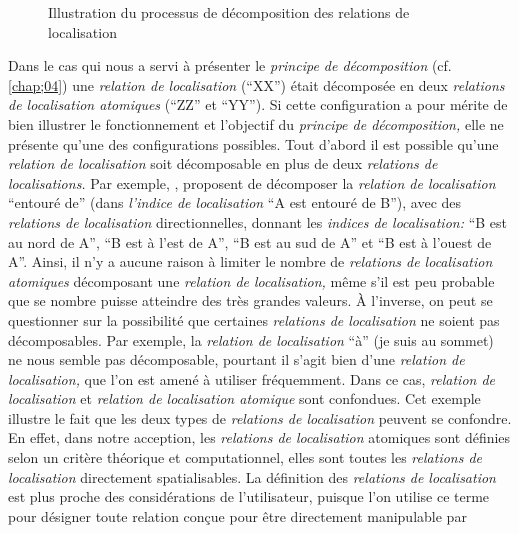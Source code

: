 
\begin{figure}
  \centering
  
  \caption{Illustration du processus de décomposition des relations de
  localisation}
  \label{fig:logique_dec}
\end{figure}


Dans le cas qui nous a servi à présenter le \emph{principe de
  décomposition} (cf. \autoref{chap;04}) une \emph{relation de
  localisation} (\enquote{XX}) était décomposée en deux
\emph{relations de localisation atomiques} (\enquote{ZZ} et
\enquote{YY}). Si cette configuration a pour mérite de bien illustrer
le fonctionnement et l'objectif du \emph{principe de décomposition,}
elle ne présente qu'une des configurations possibles. Tout d'abord il
est possible qu'une \emph{relation de localisation} soit décomposable
en plus de deux \emph{relations de localisations.} Par exemple,
\textcite{Vanegas2011}, proposent de décomposer la \emph{relation de
  localisation} \enquote{entouré de} (dans \emph{l'indice de
  localisation} \enquote{A est entouré de B}), avec des
\emph{relations de localisation} directionnelles, donnant les
\emph{indices de localisation:} \enquote{B est au nord de A},
\enquote{B est à l'est de A}, \enquote{B est au sud de A} et
\enquote{B est à l'ouest de A}. Ainsi, il n'y a aucune raison à
limiter le nombre de \emph{relations de localisation atomiques}
décomposant une \emph{relation de localisation,} même s'il est peu
probable que se nombre puisse atteindre des très grandes valeurs. À
l'inverse, on peut se questionner sur la possibilité que certaines
\emph{relations de localisation} ne soient pas décomposables. Par
exemple, la \emph{relation de localisation} \enquote{à} (\eg je suis
au sommet) ne nous semble pas décomposable, pourtant il s'agit bien
d'une \emph{relation de localisation,} que l'on est amené à utiliser
fréquemment. Dans ce cas, \emph{relation de localisation} et
\emph{relation de localisation atomique} sont confondues. Cet exemple
illustre le fait que les deux types de \emph{relations de
  localisation} peuvent se confondre. En effet, dans notre acception,
les \emph{relations de localisation} atomiques sont définies selon un
critère théorique et computationnel, elles sont toutes les
\emph{relations de localisation} directement spatialisables. La
définition des \emph{relations de localisation} est plus proche des
considérations de l'utilisateur, puisque l'on utilise ce terme pour
désigner toute relation conçue pour être directement manipulable par
